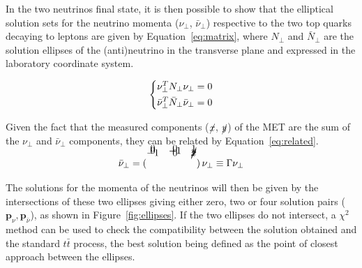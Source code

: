 \documentclass[a4paper, 10pt, openright]{report}
\begin{document}
\begin{itemize}
In the two neutrinos final state, it is then possible to show that the elliptical solution sets for the neutrino momenta ($\nu_\perp$, $\bar \nu_\perp$) respective to the two top quarks decaying to leptons are given by Equation~\ref{eq:matrix}, where $N_\perp$ and $\bar N_\perp$ are the solution ellipses of the (anti)neutrino in the transverse plane and expressed in the laboratory coordinate system.


\begin{equation}
\label{eq:matrix}
\begin{dcases}
\nu_\perp^T N_\perp \nu_\perp = 0 \\
\bar \nu_\perp^T \bar N_\perp \bar \nu_\perp = 0
\end{dcases}
\end{equation}

Given the fact that the measured components ($\cancel{x}$, $\cancel{y}$) of the \ac{MET} are the sum of the $\nu_\perp$ and $\bar \nu_\perp$ components, they can be related by Equation~\ref{eq:related}.

\begin{equation}
\label{eq:related}
\bar \nu_\perp = \begin{pmatrix}
\\[-1.3cm] -1 & 0 & \cancel{x} \\[-0.5cm]
0 & -1 & \cancel{y} \\[-0.5cm]
0 & 0 & 1
\end{pmatrix} \nu_\perp \equiv \Gamma \nu_\perp
\end{equation}

The solutions for the momenta of the neutrinos will then be given by the intersections of these two ellipses giving either zero, two or four solution pairs ($\bm{p}_\nu, \bm{p}_{\bar \nu}$), as shown in Figure~\ref{fig:ellipses}. If the two ellipses do not intersect, a $\chi^2$ method can be used to check the compatibility between the solution obtained and the standard $t \bar t$ process, the best solution being defined as the point of closest approach between the ellipses.


\end{itemize}
\end{document}

